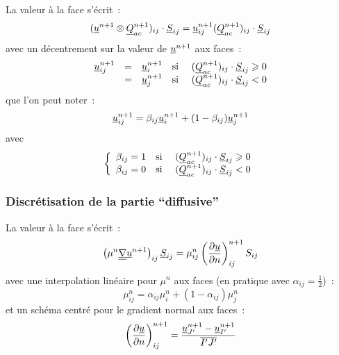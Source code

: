 La valeur \`a la face s'\'ecrit~:
\begin{equation}
(\underline{u}^{n+1} \otimes \underline{Q}_{ac}^{n+1})_{ij}\cdot \underline{S}_{ij}
= \underline{u}_{ij}^{n+1}(\underline{Q}_{ac}^{n+1})_{ij} \cdot \underline{S}_{ij}
\end{equation}
avec un d\'ecentrement sur la valeur de $\underline{u}^{n+1}$ aux faces~:
\begin{equation}
\begin{array}{lllll}
\underline{u}_{ij}^{n+1}
& = & \underline{u}_i^{n+1}
& \text{si\ } & (\underline{Q}_{ac}^{n+1})_{ij} \cdot \underline{S}_{ij} \geqslant 0 \\
& = & \underline{u}_j^{n+1}
& \text{si\ } & (\underline{Q}_{ac}^{n+1})_{ij} \cdot \underline{S}_{ij} < 0 \\
\end{array}
\end{equation}
que l'on peut noter~:
\begin{equation}
\underline{u}_{ij}^{n+1}
 = \beta_{ij}\underline{u}_i^{n+1} + (1-\beta_{ij})\underline{u}_j^{n+1}
\end{equation}
avec
\begin{equation}
\left\{\begin{array}{lll}
\beta_{ij} = 1 & \text{si\ }
& (\underline{Q}_{ac}^{n+1})_{ij} \cdot \underline{S}_{ij} \geqslant 0 \\
\beta_{ij} = 0 & \text{si\ }
& (\underline{Q}_{ac}^{n+1})_{ij} \cdot \underline{S}_{ij} < 0 \\
\end{array}\right.
\end{equation}

\subsubsection*{Discr\'etisation de la partie ``diffusive''}

La valeur \`a la face s'\'ecrit~:
\begin{equation}
\left(\mu^n\underline{\underline{{\nabla}}}{\underline{u}^{n+1}}\right)_{ij}\underline{S}_{ij}
= \mu_{ij}^n
\displaystyle \left( \frac{\partial \underline{u}}{\partial n} \right)^{n+1}_{ij}
S_{ij}
\end{equation}
avec une interpolation lin\'eaire pour $\mu^n$ aux faces (en pratique avec
$\alpha_{ij}=\frac{1}{2}$)~:
\begin{equation}
\mu_{ij}^n
= \alpha_{ij}\mu_{i}^n+(1-\alpha_{ij})\mu_{j}^n
\end{equation}
et un sch\'ema centr\'e pour le gradient normal aux faces~:
\begin{equation}
\displaystyle \left( \frac{\partial \underline{u}}{\partial n} \right)^{n+1}_{ij}
= \displaystyle\frac{\underline{u}_{J'}^{n+1}-\underline{u}_{I'}^{n+1}}{\overline{I'J'}}
\end{equation}

